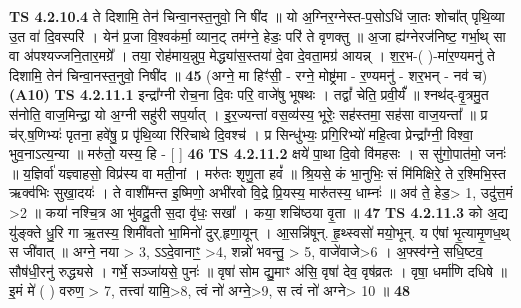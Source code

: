 \documentclass[17pt]{extarticle}
\begin{document}
                  \newline
                                \textbf{ TS 4.2.10.4} \newline
                  ते दिशामि॒ तेन॑ चिन्वा॒नस्त॒नुवो॒ नि षी॑द ॥ यो अ॒ग्निर॒ग्नेस्त-प॒सोऽधि॑ जा॒तः शोचा᳚त् पृथि॒व्या उ॒त वा॑ दि॒वस्परि॑ । येन॑ प्र॒जा वि॒श्वक॑र्मा॒ व्यान॒ट् तम॑ग्ने॒ हेडः॒ परि॑ ते वृणक्तु ॥ अ॒जा ह्य॑ग्नेरज॑निष्ट॒ गर्भा॒थ् सा वा अ॑पश्यज्जनि॒तार॒मग्रे᳚ । तया॒ रोह॑माय॒न्नुप॒ मेद्ध्या॑स॒स्तया॑ दे॒वा दे॒वता॒मग्र॑ आयन्न् । श॒र॒भ-( )-मा॑र॒ण्यमनु॑ ते दिशामि॒ तेन॑ चिन्वा॒नस्त॒नुवो॒ निषी॑द ॥ \textbf{  45 } \newline
                  \newline
                      (अग्ने॒ मा हिꣳ॑सी॒ - रग्ने॒ मोष्ट्र॑मा - र॒ण्यमनु॑ - शर॒भन् - नव॑ च)  \textbf{(A10)} \newline \newline
                                        \textbf{ TS 4.2.11.1} \newline
                  इन्द्रा᳚ग्नी रोच॒ना दि॒वः परि॒ वाजे॑षु भूषथः । तद्वां᳚ चेति॒ प्रवी॒र्यं᳚ ॥ श्नथ॑द्-वृ॒त्रमु॒त स॑नोति॒ वाज॒मिन्द्रा॒ यो अ॒ग्नी सहु॑री सप॒र्यात् । इ॒र॒ज्यन्ता॑ वस॒व्य॑स्य॒ भूरेः॒ सह॑स्तमा॒ सह॑सा वाज॒यन्ता᳚ ॥ प्र च॑र्.ष॒णिभ्यः॑ पृतना॒ हवे॑षु॒ प्र पृ॑थि॒व्या रि॑रिचाथे दि॒वश्च॑ । प्र सिन्धु॑भ्यः॒ प्रगि॒रिभ्यो॑ महि॒त्वा प्रेन्द्रा᳚ग्नी॒ विश्वा॒ भुव॒नाऽत्य॒न्या ॥ मरु॑तो॒ यस्य॒ हि - [  ] \textbf{  46 } \newline
                  \newline
                                \textbf{ TS 4.2.11.2} \newline
                  क्षये॑ पा॒था दि॒वो वि॑महसः । स सु॑गो॒पात॑मो॒ जनः॑ ॥ य॒ज्ञिर्वा॑ यज्ञ्वाहसो॒ विप्र॑स्य वा मती॒नां । मरु॑तः शृणु॒ता हवं᳚ ॥ श्रि॒यसे॒ कं भा॒नुभिः॒ सं मि॑मिक्षिरे॒ ते र॒श्मिभि॒स्त ऋक्व॑भिः सुखा॒दयः॑ । ते वाशी॑मन्त इ॒ष्मिणो॒ अभी॑रवो वि॒द्रे प्रि॒यस्य॒ मारु॑तस्य॒ धाम्नः॑ ॥ अव॑ ते॒ हेड॒> 1, उदु॑त्त॒मं >2 ॥ कया॑ नश्चि॒त्र आ भु॑वदू॒ती स॒दा वृ॑धः॒ सखा᳚ । कया॒ शचि॑ष्ठया वृ॒ता ॥ \textbf{  47} \newline
                  \newline
                                \textbf{ TS 4.2.11.3} \newline
                  को अ॒द्य यु॑ङ्क्ते धु॒रि गा ऋ॒तस्य॒ शिमी॑वतो भा॒मिनो॑ दुर्.हृणा॒यून् । आ॒सन्नि॑षून्. हृ॒थ्स्वसो॑ मयो॒भून्. य ए॑षां भृ॒त्यामृ॒णध॒थ् स जी॑वात् ॥ अग्ने॒ नया > 3, ऽऽदे॒वानाꣳ॒॒ >4, शन्नो॑ भवन्तु॒ > 5, वाजे॑वाजे>6 । अ॒फ्स्व॑ग्ने॒ सधि॒ष्टव॒ सौष॑धी॒रनु॑ रुद्ध्यसे । गर्भे॒ सञ्जा॑यसे॒ पुनः॑ ॥ वृषा॑ सोम द्यु॒माꣳ अ॑सि॒ वृषा॑ देव॒ वृष॑व्रतः । वृषा॒ धर्मा॑णि दधिषे ॥ इ॒मं मे॑ ( ) वरुण॒ > 7, तत्त्वा॑ यामि॒>8, त्वं नो॑ अग्ने॒>9, स त्वं नो॑ अग्ने> 10 ॥ \textbf{  48 } \newline
\end{document}
